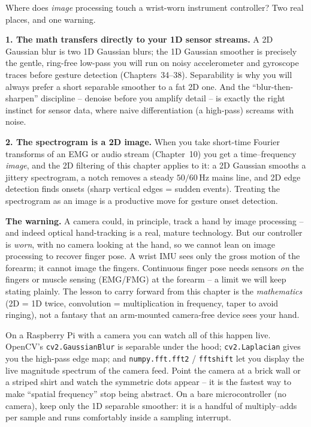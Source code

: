 \begin{goalbox}
Where does \emph{image} processing touch a wrist-worn instrument controller? Two
real places, and one warning.

\textbf{1. The math transfers directly to your 1D sensor streams.} A 2D Gaussian
blur is two 1D Gaussian blurs; the 1D Gaussian smoother is precisely the gentle,
ring-free low-pass you will run on noisy accelerometer and gyroscope traces before
gesture detection (Chapters~34--38). Separability is why you will always prefer a
short separable smoother to a fat 2D one. And the ``blur-then-sharpen'' discipline
-- denoise before you amplify detail -- is exactly the right instinct for sensor
data, where naive differentiation (a high-pass) screams with noise.

\textbf{2. The spectrogram is a 2D image.} When you take short-time Fourier
transforms of an EMG or audio stream (Chapter~10) you get a time--frequency
\emph{image}, and the 2D filtering of this chapter applies to it: a 2D Gaussian
smooths a jittery spectrogram, a notch removes a steady $50/60$\,Hz mains line, and
2D edge detection finds onsets (sharp vertical edges = sudden events). Treating the
spectrogram as an image is a productive move for gesture onset detection.

\textbf{The warning.} A camera could, in principle, track a hand by image
processing -- and indeed optical hand-tracking is a real, mature technology. But our
controller is \emph{worn}, with no camera looking at the hand, so we cannot lean on
image processing to recover finger pose. A wrist IMU sees only the gross motion of
the forearm; it cannot image the fingers. Continuous finger pose needs sensors
\emph{on} the fingers or muscle sensing (EMG/FMG) at the forearm -- a limit we will
keep stating plainly. The lesson to carry forward from this chapter is the
\emph{mathematics} (2D = 1D twice, convolution = multiplication in frequency,
taper to avoid ringing), not a fantasy that an arm-mounted camera-free device sees
your hand.
\end{goalbox}

\begin{buildbox}
On a Raspberry Pi with a camera you can watch all of this happen live. OpenCV's
\texttt{cv2.GaussianBlur} is separable under the hood; \texttt{cv2.Laplacian}
gives you the high-pass edge map; and \texttt{numpy.fft.fft2} / \texttt{fftshift}
let you display the live magnitude spectrum of the camera feed. Point the camera at
a brick wall or a striped shirt and watch the symmetric dots appear -- it is the
fastest way to make ``spatial frequency'' stop being abstract. On a bare
microcontroller (no camera), keep only the 1D separable smoother: it is a handful
of multiply--adds per sample and runs comfortably inside a sampling interrupt.
\end{buildbox}

